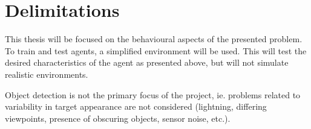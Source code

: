 
\section{Delimitations}
\label{sec:delimitations}

This thesis will be focused on the behavioural aspects of the presented problem. To train and test agents, a simplified environment will be used. This will test the desired characteristics of the agent as presented above, but will not simulate realistic environments.

Object detection is not the primary focus of the project, ie. problems related to variability in target appearance are not considered (lightning, differing viewpoints, presence of obscuring objects, sensor noise, etc.).



